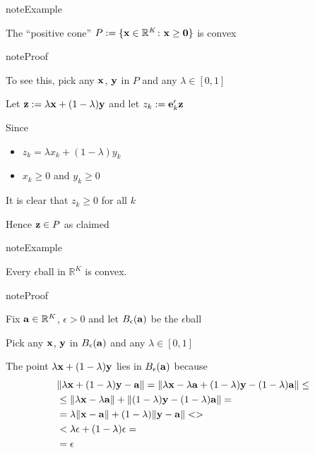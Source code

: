 \documentclass[letterpaper,10pt,english]{jupyterBook}
\begin{document}
\begin{sphinxadmonition}{note}{Example}

\sphinxAtStartPar
The “positive cone” \(P := \{ {\bf x} \in \mathbb{R}^K \colon {\bf x } \geq {\bf 0} \}\) is convex
\end{sphinxadmonition}

\begin{sphinxadmonition}{note}{Proof}

\sphinxAtStartPar
To see this, pick any \({\bf x}\), \({\bf y}\) in \(P\) and any \(\lambda \in [0, 1]\)

\sphinxAtStartPar
Let \({\bf z} := \lambda {\bf x} + (1 - \lambda) {\bf y}\) and let \(z_k :=
{\bf e}_k' {\bf z}\)

\sphinxAtStartPar
Since
\begin{itemize}
\item {} 
\sphinxAtStartPar
\(z_k = \lambda x_k + (1 - \lambda) y_k\)

\item {} 
\sphinxAtStartPar
\(x_k \geq 0\) and \(y_k \geq 0\)

\end{itemize}

\sphinxAtStartPar
It is clear that \(z_k \geq 0\) for all \(k\)

\sphinxAtStartPar
Hence \({\bf z} \in P\) as claimed
\end{sphinxadmonition}

\begin{sphinxadmonition}{note}{Example}

\sphinxAtStartPar
Every \(\epsilon\)\sphinxhyphen{}ball in \(\mathbb{R}^K\) is convex.
\end{sphinxadmonition}

\begin{sphinxadmonition}{note}{Proof}

\sphinxAtStartPar
Fix \({\bf a} \in \mathbb{R}^K\), \(\epsilon > 0\) and let
\(B_\epsilon({\bf a})\) be the \(\epsilon\)\sphinxhyphen{}ball

\sphinxAtStartPar
Pick any \({\bf x}\), \({\bf y}\) in \(B_\epsilon({\bf a})\) and any \(\lambda \in [0, 1]\)

\sphinxAtStartPar
The point \(\lambda {\bf x} + (1 - \lambda) {\bf y}\) lies in
\(B_\epsilon({\bf a})\) because
\begin{equation*}
\begin{split}
%
& \| \lambda {\bf x} + (1 - \lambda) {\bf y} - {\bf a} \|
= \| \lambda {\bf x} - \lambda {\bf a} 
+ (1 - \lambda) {\bf y} - (1 - \lambda) {\bf a} \| \leq
\\ &
\leq \| \lambda {\bf x} - \lambda {\bf a} \|
+ \| (1 - \lambda) {\bf y} - (1 - \lambda) {\bf a} \| =
\\ &
= \lambda \| {\bf x} - {\bf a} \|
+ (1 - \lambda) \| {\bf y} - {\bf a} \| <>
\\ &
< \lambda \epsilon + (1 - \lambda) \epsilon =
\\ &
= \epsilon
%
\end{split}
\end{equation*}\end{sphinxadmonition}
\end{document}
